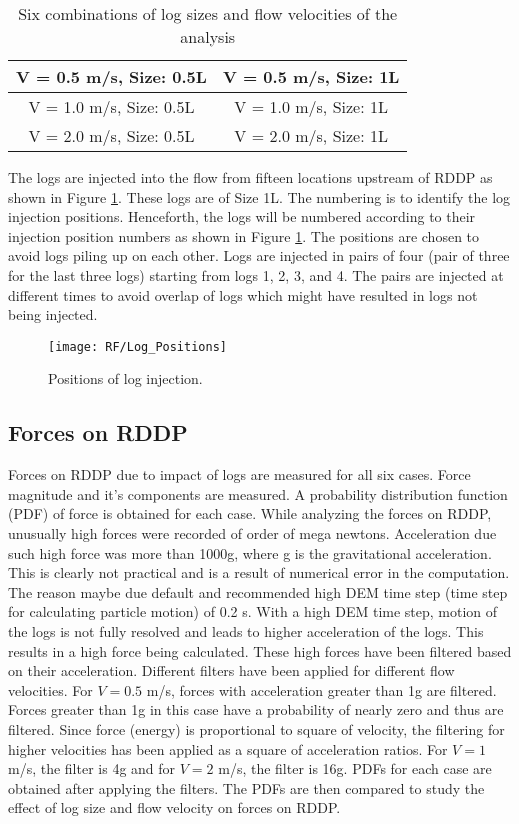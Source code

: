 \begin{table}
\centering
\caption{Six combinations of log sizes and flow velocities of the analysis}
\label{case combination}
\begin{tabular}{|c|c|}
\hline
V = 0.5 m/s, Size: 0.5L & V = 0.5 m/s, Size: 1L \\ \hline
V = 1.0 m/s, Size: 0.5L & V = 1.0 m/s, Size: 1L \\ \hline
V = 2.0 m/s, Size: 0.5L & V = 2.0 m/s, Size: 1L \\\hline
\end{tabular}
\end{table}

The logs are injected into the flow from fifteen locations upstream of RDDP as shown in Figure \ref{fig:Log_Positions}. These logs are of Size 1L. The numbering is to identify the log injection positions. Henceforth, the logs will be numbered according to their injection position numbers as shown in Figure \ref{fig:Log_Positions}. The positions are chosen to avoid logs piling up on each other. Logs are injected in pairs of four (pair of three for the last three logs) starting from logs 1, 2, 3, and 4. The pairs are injected at different times to avoid overlap of logs which might have resulted in logs not being injected. 

\begin{figure}
\centering
\texttt{[image: RF/Log\_Positions]}
\caption{\label{fig:Log_Positions}Positions of log injection.}
\end{figure} 

\subsection{Forces on RDDP}
Forces on RDDP due to impact of logs are measured for all six cases. Force magnitude and it's components are measured. A probability distribution function (PDF) of force is obtained for each case. While analyzing the forces on RDDP, unusually high forces were recorded of order of mega newtons. Acceleration due such high force was more than 1000g, where g is the gravitational acceleration. This is clearly not practical and is a result of numerical error in the computation. The reason maybe due default and recommended high DEM time step (time step for calculating particle motion) of 0.2 s. With a high DEM time step, motion of the logs is not fully resolved and leads to higher acceleration of the logs. This results in a high force being calculated. These high forces have been filtered based on their acceleration. Different filters have been applied for different flow velocities. For $V = 0.5$ m/s, forces with acceleration greater than 1g are filtered. Forces greater than 1g in this case have a probability of nearly zero and thus are filtered. Since force (energy) is proportional to square of velocity, the filtering for higher velocities has been applied as a square of acceleration ratios. For $V = 1$ m/s, the filter is 4g and for $V = 2$ m/s, the filter is 16g. PDFs for each case are obtained after applying the filters. The PDFs are then compared to study the effect of log size and flow velocity on forces on RDDP.\\
